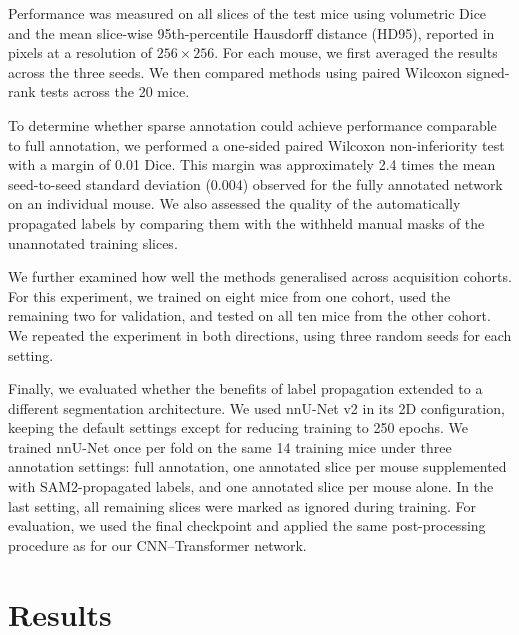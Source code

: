 \documentclass{article}
\begin{document}
Performance was measured on all slices of the test mice using volumetric Dice and the mean slice-wise 95th-percentile Hausdorff distance (HD95), reported in pixels at a resolution of $256\times256$. For each mouse, we first averaged the results across the three seeds. We then compared methods using paired Wilcoxon signed-rank tests across the 20 mice.

To determine whether sparse annotation could achieve performance comparable to full annotation, we performed a one-sided paired Wilcoxon non-inferiority test with a margin of 0.01 Dice. This margin was approximately 2.4 times the mean seed-to-seed standard deviation (0.004) observed for the fully annotated network on an individual mouse. We also assessed the quality of the automatically propagated labels by comparing them with the withheld manual masks of the unannotated training slices.

We further examined how well the methods generalised across acquisition cohorts. For this experiment, we trained on eight mice from one cohort, used the remaining two for validation, and tested on all ten mice from the other cohort. We repeated the experiment in both directions, using three random seeds for each setting.

Finally, we evaluated whether the benefits of label propagation extended to a different segmentation architecture. We used nnU-Net v2 \cite{isensee2021nnunet} in its 2D configuration, keeping the default settings except for reducing training to 250 epochs. We trained nnU-Net once per fold on the same 14 training mice under three annotation settings: full annotation, one annotated slice per mouse supplemented with SAM2-propagated labels, and one annotated slice per mouse alone. In the last setting, all remaining slices were marked as ignored during training. For evaluation, we used the final checkpoint and applied the same post-processing procedure as for our CNN--Transformer network.

\section{Results}
\label{sec:results}
\end{document}
